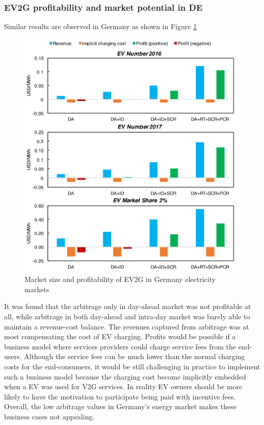 \subsubsection{EV2G profitability and market potential in DE}

Similar results are observed in Germany as shown in Figure \ref{fig:Germany_EV}


\begin{figure}[h!]
	\centering
	\includegraphics[width=0.95\linewidth]{Figures/Germany_EV_profit}
	\caption{Market size and profitability of EV2G in Germany electricity markets}
	\label{fig:Germany_EV}
\end{figure}

It was found that the arbitrage only in day-ahead market was not profitable at all, while arbitrage in both day-ahead and intra-day market was barely able to maintain a revenue-cost balance. The revenues captured from arbitrage was at most compensating the cost of EV charging. Profits would be possible if a business model where services providers could charge service fees from the end-users. Although the service fees can be much lower than the normal charging costs for the end-consumers, it would be still challenging in practice to implement such a business model because the charging cost become implicitly embedded when a EV was used for V2G services. In reality EV owners should be more likely to have the motivation to participate being paid with incentive fees. Overall, the low arbitrage values in Germany's energy market makes these business cases not appealing. 

